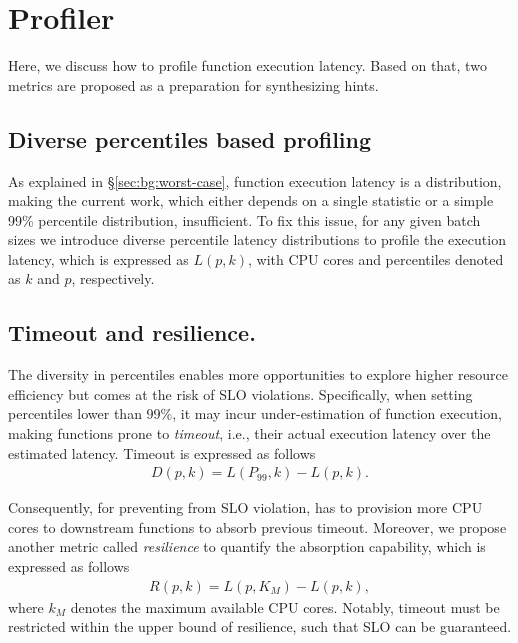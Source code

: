 \section{Profiler}
\label{sec:profilier}
Here,  we discuss how to profile function execution latency.
Based on that, two metrics are proposed as a preparation for synthesizing hints.
\subsection{Diverse percentiles based profiling}
As explained in \S{\ref{sec:bg:worst-case}}, function execution latency is a distribution, making the current work, which either depends on a single statistic or a simple 99\% percentile distribution, insufficient.
To fix this issue, for any given batch sizes we introduce diverse percentile latency distributions to profile the execution latency, which is expressed as $L(p,k)$, with CPU cores and percentiles denoted as $k$ and $p$, respectively.

\subsection{Timeout and resilience.}
The diversity in percentiles enables more opportunities to explore higher resource efficiency but comes at the risk of SLO violations.
Specifically, when setting percentiles lower than 99\%, it may incur under-estimation of function execution, making functions prone to \textit{timeout}, i.e., their actual execution latency over the estimated latency.
Timeout is expressed as follows
\begin{eqnarray}
     D(p,k) = L(P_{99},k) -L(p,k).
\end{eqnarray}

Consequently, for preventing from SLO violation, \namex has to provision more CPU cores to downstream functions to absorb previous timeout.
Moreover, we propose another metric called \emph{resilience} to quantify the absorption capability, which is expressed as follows
\begin{eqnarray}
    R(p,k)= L(p,K_M)-L(p,k),
\end{eqnarray}
where $k_M$ denotes the maximum available CPU cores.
Notably, timeout must be restricted within the upper bound of resilience, such that SLO can be guaranteed.

 







